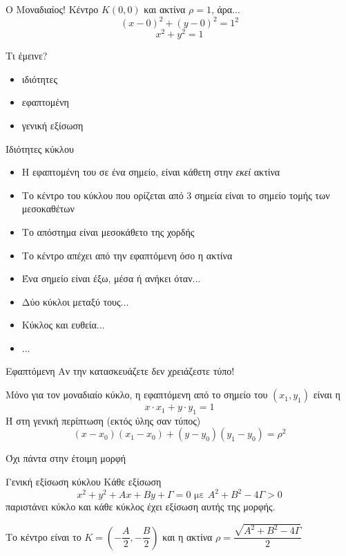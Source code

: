 \documentclass[greek]{beamer}
\begin{document}
\begin{frame}{Ο Μοναδιαίος!}
  Κέντρο $Κ(0,0)$ και ακτίνα $ρ=1$, άρα...
  $$(x-0)^2+(y-0)^2=1^2$$
  $$x^2+y^2=1$$
\end{frame}

\begin{frame}{Τι έμεινε?}
  \begin{itemize}
    \item ιδιότητες
    \item εφαπτομένη
    \item γενική εξίσωση
  \end{itemize}
\end{frame}

\begin{frame}{Ιδιότητες κύκλου}
  \begin{itemize}
    \item<1-> Η εφαπτομένη του σε ένα σημείο, είναι κάθετη στην \emph{εκεί} ακτίνα
    \item<2-> Το κέντρο του κύκλου που ορίζεται από $3$ σημεία είναι το σημείο τομής των μεσοκαθέτων
    \item<3-> Το απόστημα είναι μεσοκάθετο της χορδής
    \item<4-> Το κέντρο απέχει από την εφαπτόμενη όσο η ακτίνα
    \item<5-> Ένα σημείο είναι έξω, μέσα ή ανήκει όταν...
    \item<6-> Δύο κύκλοι μεταξύ τους...
    \item<7-> Κύκλος και ευθεία...
    \item<8-> ...
  \end{itemize}

\end{frame}

\begin{frame}[label=Εφαπτόμενη]{Εφαπτόμενη}
  Αν την κατασκευάζετε δεν χρειάζεστε τύπο!

  Μόνο για τον μοναδιαίο κύκλο, η εφαπτόμενη από το σημείο του $(x_1,y_1)$ είναι η
  $$x\cdot x_1+y\cdot y_1=1$$
  Ή στη γενική περίπτωση (εκτός ύλης σαν τύπος)
  $$(x-x_0)(x_1-x_0)+(y-y_0)(y_1-y_0)=ρ^2$$

  \hyperlink{Απόδειξη}{}
\end{frame}

\begin{frame}[label=ΓενικήΕξίσωση]{Όχι πάντα στην έτοιμη μορφή}

  \begin{block}{Γενική εξίσωση κύκλου}
    Κάθε εξίσωση
    $$x^2+y^2+Αx+Βy+Γ=0\text{ με }Α^2+Β^2-4Γ>0$$
    παριστάνει κύκλο και κάθε κύκλος έχει εξίσωση αυτής της μορφής.

    Το κέντρο είναι το $Κ=(-\dfrac{Α}{2},-\dfrac{Β}{2})$ και η ακτίνα $ρ=\dfrac{\sqrt{Α^2+Β^2-4Γ}}{2}$
  \end{block}

  \hyperlink{Απόδειξη2}{}

  \hyperlink{Απόδειξη3}{}
\end{frame}
\end{document}
